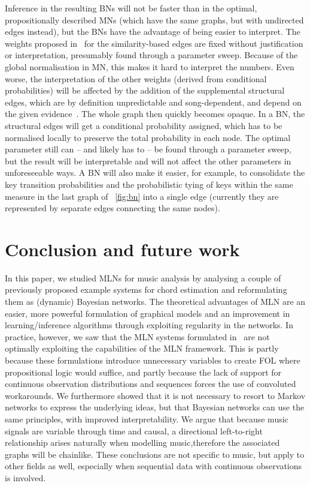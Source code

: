 \documentclass[letterpaper]{article} %
\newcommand{\figref}[1]{\figurename~\ref{fig:#1}} %
\begin{document}
Inference in the resulting BNs will not be faster than in the optimal, propositionally described MNs (which have the same graphs, but with undirected edges instead), but the BNs have the advantage of being easier to interpret. The weights proposed in~\cite{papadopoulos2017taslp} for the similarity-based edges are fixed without justification or interpretation, presumably found through a parameter sweep. Because of the global normalisation in MN, this makes it hard to interpret the numbers. Even worse, the interpretation of the other weights (derived from conditional probabilities) will be affected by the addition of the supplemental structural edges, which are by definition unpredictable and song-dependent, and depend on the given evidence~\cite{jain2011ki}. The whole graph then quickly becomes opaque. In a BN, the structural edges will get a conditional probability assigned, which has to be normalised locally to preserve the total probability in each node. The optimal parameter still can -- and likely has to -- be found through a parameter sweep, but the result will be interpretable and will not affect the other parameters in unforeseeable ways. A BN will also make it easier, for example, to consolidate the key transition probabilities and the probabilistic tying of keys within the same measure in the last graph of \figref{bn} into a single edge (currently they are represented by separate edges connecting the same nodes).








\section{Conclusion and future work}
In this paper, we studied MLNs for music analysis by analysing a couple of previously proposed example systems for chord estimation and reformulating them as (dynamic) Bayesian networks. The theoretical advantages of MLN are an easier, more powerful formulation of graphical models and an improvement in learning/inference algorithms through exploiting regularity in the networks. In practice, however, we saw that the MLN systems formulated in~\cite{papadopoulos2012ismir,papadopoulos2013icassp,papadopoulos2017taslp} are not optimally exploiting the capabilities of the MLN framework. This is partly because these formulations introduce unnecessary variables to create FOL where propositional logic would suffice, and partly because the lack of support for continuous observation distributions and sequences forces the use of convoluted workarounds. We furthermore showed that it is not necessary to resort to Markov networks to express the underlying ideas, but that Bayesian networks can use the same principles, with improved interpretability. We argue that because music signals are variable through time and causal, a directional left-to-right relationship arises naturally when modelling music,therefore the associated graphs will be chainlike. These conclusions are not specific to music, but apply to other fields as well, especially when sequential data with continuous observations is involved.
\end{document}
